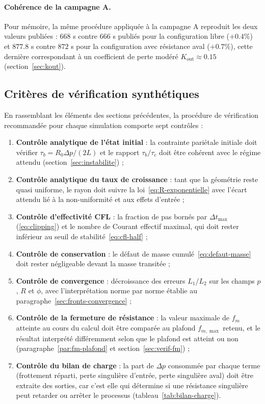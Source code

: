 \documentclass[11pt,a4paper]{report}
\newcommand{\kout}{K_{\mathrm{out}}}
\newcommand{\dt}{\Delta t}
\begin{document}
\paragraph{Cohérence de la campagne A.} Pour mémoire, la même procédure appliquée à la campagne A
reproduit les deux valeurs publiées : \(668\) s contre \(666\) s publiés pour la configuration libre
(\(+0.4\%\)) et \(877.8\) s contre \(872\) s pour la configuration avec résistance aval
(\(+0.7\%\)), cette dernière correspondant à un coefficient de perte modéré
\(\kout \approx 0.15\) (section~\ref{sec:kout}).

\subsection{Critères de vérification synthétiques}

En rassemblant les éléments des sections précédentes, la procédure de vérification recommandée pour chaque
simulation comporte sept contrôles :
\begin{enumerate}[label=\arabic*.]
  \item \textbf{Contrôle analytique de l'état initial} : la contrainte pariétale initiale doit vérifier
        \(\tau_b = R_0\Delta p/(2L)\) et le rapport \(\tau_b/\tau_c\) doit être cohérent avec le régime
        attendu (section~\ref{sec:instabilite}) ;
  \item \textbf{Contrôle analytique du taux de croissance} : tant que la géométrie reste quasi uniforme,
        le rayon doit suivre la loi~\eqref{eq:R-exponentielle} avec l'écart attendu lié à la non-uniformité
        et aux effets d'entrée ;
  \item \textbf{Contrôle d'effectivité CFL} : la fraction de pas bornés par \(\dt_{\max}\)
        (\eqref{eq:clipping}) et le nombre de Courant effectif maximal, qui doit rester inférieur au seuil
        de stabilité~\eqref{eq:cfl-half} ;
  \item \textbf{Contrôle de conservation} : le défaut de masse cumulé~\eqref{eq:defaut-masse} doit rester
        négligeable devant la masse transitée ;
  \item \textbf{Contrôle de convergence} : décroissance des erreurs \(L_1\)/\(L_2\) sur les champs
        \(p\), \(R\) et \(\phi\), avec l'interprétation norme par norme établie
        au paragraphe~\ref{sec:fronts-convergence} ;
  \item \textbf{Contrôle de la fermeture de résistance} : la valeur maximale de \(f_m\) atteinte au cours
        du calcul doit être comparée au plafond \(f_{m,\max}\) retenu, et le résultat interprété
        différemment selon que le plafond est atteint ou non (paragraphe~\ref{par:fm-plafond} et
        section~\ref{sec:verif-fm}) ;
  \item \textbf{Contrôle du bilan de charge} : la part de \(\Delta p\) consommée par chaque terme
        (frottement réparti, perte singulière d'entrée, perte singulière aval) doit être extraite des
        sorties, car c'est elle qui détermine si une résistance singulière peut retarder ou arrêter le
        processus (tableau~\ref{tab:bilan-charge}).
\end{enumerate}
\end{document}
